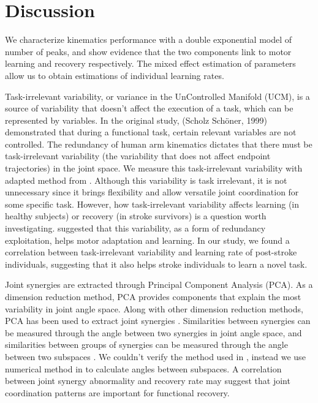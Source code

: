 \section{Discussion}
We characterize kinematics performance with a double exponential model of number of peaks, and show evidence that the two components link to motor learning and recovery respectively. 
The mixed effect estimation of parameters allow us to obtain estimations of individual learning rates.

Task-irrelevant variability, or variance in the UnControlled Manifold (UCM), is a source of variability that doesn’t affect the execution of a task, which can be represented by variables. 
In the original study, (Scholz  Schöner, 1999) demonstrated that during a functional task, certain relevant variables are not controlled.
The redundancy of human arm kinematics dictates that there must be task-irrelevant variability (the variability that does not affect endpoint trajectories) in the joint space. 
We measure this task-irrelevant variability with adapted method from \cite{Singh2016}. 
Although this variability is task irrelevant, it is not unnecessary since it brings flexibility and allow versatile joint coordination for some specific task. 
However, how task-irrelevant variability affects learning (in healthy subjects) or recovery (in stroke survivors) is a question worth investigating. 
\cite{Singh2016} suggested that this variability, as a form of redundancy exploitation, helps motor adaptation and learning. 
In our study, we found a correlation between task-irrelevant variability and learning rate of post-stroke individuals, suggesting that it also helps stroke individuals to learn a novel task.

Joint synergies are extracted through Principal Component Analysis (PCA). 
As a dimension reduction method, PCA provides components that explain the most variability in joint angle space. 
Along with other dimension reduction methods, PCA has been used to extract joint synergies \cite{Kordelaar2012}. 
Similarities between synergies can be measured through the angle between two synergies in joint angle space, and similarities between groups of synergies can be measured through the angle between two subspaces \cite{Bockemuehl2010}. 
We couldn’t verify the method used in \cite{Bockemuehl2010}, instead we use numerical method in \cite{Bjoerck1973} to calculate angles between subspaces. 
A correlation between joint synergy abnormality and recovery rate may suggest that joint coordination patterns are important for functional recovery.

